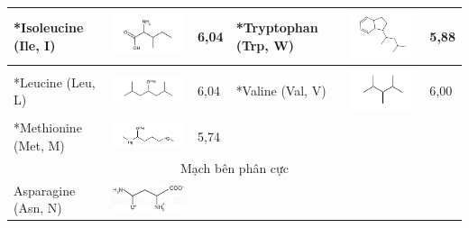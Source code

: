 \documentclass[10pt]{article}
\begin{document}
\begin{table}[h]
\begin{center}
\begin{tabular}{|l|l|l|l|l|l|}
*Isoleucine (Ile, I) & \includegraphics{smile-814e04d880ee80eed216a7b5332f461b8eeb7c25} & 6,04 & *Tryptophan (Trp, W) & \includegraphics{smile-80ee2c961dbfc41368b5eb43c971bc59ee731811} & 5,88 \\
\hline
*Leucine (Leu, L) & \includegraphics{smile-deabe8f381d9a95b2a7f05a30571636beddadbf7} & 6,04 & *Valine (Val, V) & \includegraphics{smile-4cd799a3e60a9b6e43b2412a6bd4a1d845918ddc} & 6,00 \\
\hline
*Methionine (Met, M) & \includegraphics{smile-a668f5b69044a219650e99139a863125b4e7bc1f} & 5,74 & \multicolumn{3}{|c|}{} \\
\hline
\multicolumn{6}{|c|}{Mạch bên phân cực} \\
\hline
Asparagine (Asn, N) & \includegraphics[max width=\textwidth]{2025_10_23_de6f5713836e4e91b3c8g-050(1)}

\end{tabular}
\end{center}
\end{table}
\end{document}
